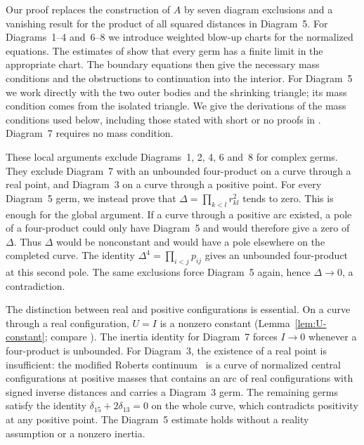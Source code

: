 \documentclass[11pt]{amsart}
\theoremstyle{definition}
\theoremstyle{remark}
\begin{document}
{
Our proof replaces the construction of $A$ by seven diagram exclusions and a vanishing result
for the product of all
squared distances in Diagram~5.  For Diagrams~1--4 and~6--8 we introduce weighted blow-up
charts for the normalized equations.  The estimates of \cite[\S3]{AK} show that every germ
has a finite limit in the appropriate chart.  The boundary equations then give the necessary
mass conditions and the obstructions to continuation into the interior.  For Diagram~5 we
work directly with the two outer bodies and the shrinking triangle; its mass condition
comes from the isolated triangle.  We give the derivations of the mass conditions used
below, including those stated with short or no proofs in \cite[\S\S8.3--8.8]{AK}.
Diagram~7 requires no mass condition.

These local arguments exclude Diagrams~1, 2, 4, 6 and~8 for complex germs.  They exclude
Diagram~7 with an unbounded four-product on a curve through a real point, and Diagram~3
on a curve through a positive point.  For every Diagram~5 germ, we instead prove that
$\Delta=\prod_{k<l}r_{kl}^2$ tends to zero.  This is enough for the global argument.
If a curve through a positive arc existed, a pole of a four-product could only have
Diagram~5 and would therefore give a zero of $\Delta$.  Thus $\Delta$ would be nonconstant
and would have a pole elsewhere on the completed curve.  The identity
$\Delta^4=\prod_{i<j}p_{ij}$ gives an unbounded four-product at this second pole.
The same exclusions force Diagram~5 again, hence $\Delta\to0$, a contradiction.

The distinction between real and positive configurations is essential.  On a curve through a real
configuration, $U=I$ is a nonzero constant (Lemma~\ref{lem:U-constant}; compare \cite[Lemma~2]{AK}).
The inertia identity for Diagram~7 forces $I\to0$ whenever a four-product is unbounded.
For Diagram~3, the existence of a real point is insufficient: the modified Roberts continuum~\cite[p.~543]{AK}
is a curve of normalized central configurations at positive masses that contains an arc of
real configurations with signed inverse distances and carries a Diagram~3 germ.  The remaining
germs satisfy the identity $\delta_{15}+2\delta_{13}=0$ on the whole curve, which contradicts
positivity at any positive point.  The Diagram~5 estimate holds without a reality assumption
or a nonzero inertia.
}
\end{document}
